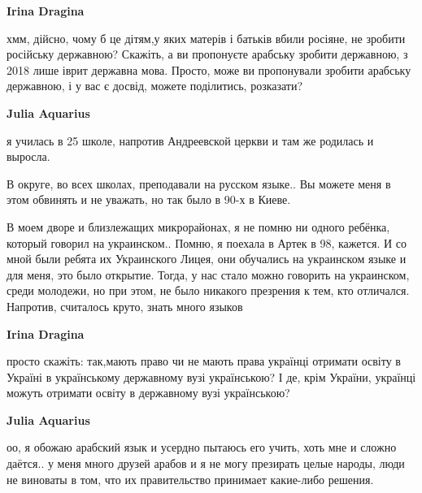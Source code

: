 \begin{itemize}
\begin{itemize}
\textbf{Irina Dragina} 

хмм, дійсно, чому б це дітям,у яких матерів і батьків вбили росіяне, не зробити
російську державною? Скажіть, а ви пропонуєте арабську зробити державною, з
2018 лише іврит державна мова. Просто, може ви пропонували зробити арабську
державною, і у вас є досвід, можете поділитись, розказати?

 
\textbf{Julia Aquarius} 

я училась в 25 школе, напротив Андреевской церкви и там же родилась и выросла.

В округе, во всех школах, преподавали на русском языке..  Вы можете меня в этом
обвинять и не уважать, но так было в 90-х в Киеве.

В моем дворе и близлежащих микрорайонах, я не помню ни одного ребёнка, который
говорил на украинском.. Помню, я поехала в Артек в 98, кажется. И со мной были
ребята их Украинского Лицея, они обучались на украинском языке и для меня, это
было открытие. Тогда, у нас стало можно говорить на украинском, среди молодежи,
но при этом, не было никакого презрения к тем, кто отличался. Напротив,
считалось круто, знать много языков


 
\textbf{Irina Dragina} 

просто скажіть: так,мають право чи не мають права українці отримати освіту в
Україні в українському державному вузі українською? І де, крім України,
українці можуть отримати освіту в державному вузі українською?

 
\textbf{Julia Aquarius} 

оо, я обожаю арабский язык и усердно пытаюсь его учить, хоть мне и сложно
даётся.. у меня много друзей арабов и я не могу презирать целые народы, люди не
виноваты в том, что их правительство принимает какие-либо решения.


\end{itemize}
\end{itemize}
